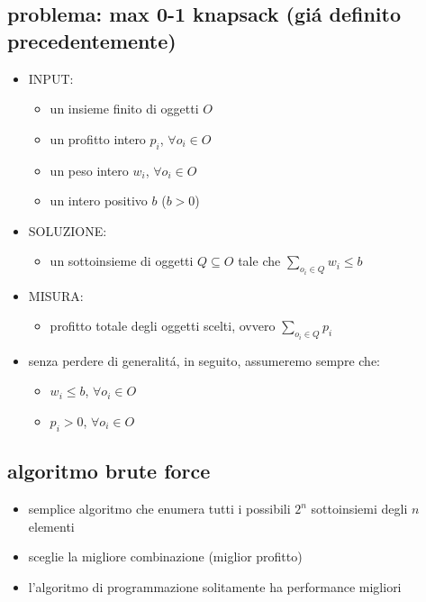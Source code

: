 
\subsection*{problema: max 0-1 knapsack (gi\'a definito precedentemente)}
\begin{flushleft}
	\begin{itemize}
		\item INPUT:
		\begin{itemize}
			\item un insieme finito di oggetti $O$
			\item un profitto intero $p_i$, $\forall o_i\in O$
			\item un peso intero $w_i$, $\forall o_i\in O$
			\item un intero positivo $b$ ($b>0$)
		\end{itemize}
		\item SOLUZIONE:
		\begin{itemize}
			\item un sottoinsieme di oggetti $Q\subseteq O$ tale che $\sum_{o_i\in Q}w_i\leq b$
		\end{itemize}
		\item MISURA:
		\begin{itemize}
			\item profitto totale degli oggetti scelti, ovvero $\sum_{o_i\in Q}p_i$
		\end{itemize}
		\vspace{0.5cm}
		\item senza perdere di generalit\'a, in seguito, assumeremo sempre che:
		\begin{itemize}
			\item $w_i\leq b$, $\forall o_i\in O$
			\item $p_i>0$, $\forall o_i\in O$
		\end{itemize}
	\end{itemize}
\end{flushleft}


\subsection*{algoritmo brute force}
\begin{flushleft}
	\begin{itemize}
		\item semplice algoritmo che enumera tutti i possibili $2^n$ sottoinsiemi degli $n$ elementi
		\item sceglie la migliore combinazione (miglior profitto)
		\item l'algoritmo di programmazione solitamente ha performance migliori
	\end{itemize}
\end{flushleft}

